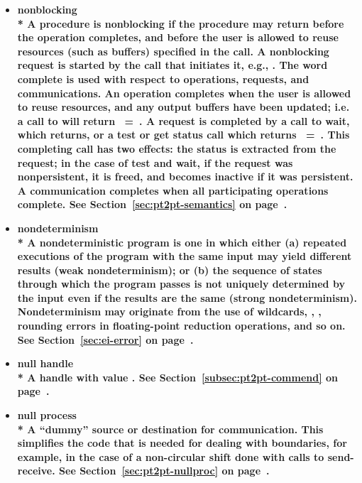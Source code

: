 \begin{itemize}
\label{glossary:nonblocking}
\item \bf{ nonblocking} \\*
 A procedure is nonblocking if the procedure may return before the
operation completes, and before the user is allowed to reuse
resources (such as buffers) specified in the call.
A nonblocking request is {\bf started} by the call that initiates it, e.g.,
.
The word complete is used with respect to operations, requests, and
communications.  An {\bf operation completes} when the user is allowed
to reuse resources, and any output buffers have been updated; i.e. a
call to  will return
~=~.  A {\bf request is completed} by a call
to wait, which returns, or a test or get status call which returns
~=~.  This completing call has two effects:
the status is extracted from the request; in the case of test and
wait, if the request was nonpersistent, it is
{\bf freed}, and becomes {\bf inactive} if it was persistent.
A {\bf communication completes} when all participating operations complete.
See Section~\ref{sec:pt2pt-semantics} on page~\pageref{sec:pt2pt-semantics}.

\label{glossary:nondeterminism}
\item \bf{ nondeterminism} \\*
A nondeterministic program is one in which either (a) repeated executions 
of the program with the same input may yield different results (weak 
nondeterminism); or (b) the sequence of states through which the program 
passes is not uniquely determined by the input even if the results are the 
same (strong nondeterminism). Nondeterminism may originate from the 
use of wildcards, , , rounding errors in floating-point 
reduction operations, and so on.
See Section~\ref{sec:ei-error} on page~\pageref{sec:ei-error}.

\label{glossary:null_handle}
\item \bf{ null handle} \\*
A handle with value \linebreak {}.
See Section~\ref{subsec:pt2pt-commend} on page~\pageref{subsec:pt2pt-commend}.


\label{glossary:null_process}
\item \bf{ null process} \\*
A ``dummy'' source or
destination
for communication.  This simplifies the code that is needed for dealing with
boundaries, for example, in the case of a non-circular shift done with calls to
send-receive.
See Section~\ref{sec:pt2pt-nullproc} on page~\pageref{sec:pt2pt-nullproc}.


\end{itemize}
